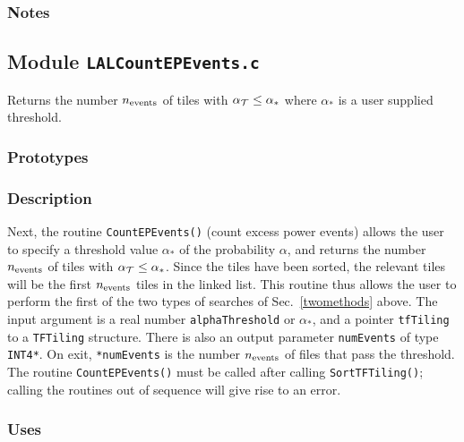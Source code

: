 \subsubsection*{Notes}

\vfill{\footnotesize}

\newpage
\subsection{Module \texttt{LALCountEPEvents.c}}
\label{ss:LALCountEPEvents.c}

Returns the number $n_{\rm events}$ of tiles with $\alpha_{\cal T} \le
\alpha_*$ where $\alpha_*$ is a user supplied threshold.

\subsubsection*{Prototypes}
\vspace{0.1in}


\subsubsection*{Description}

Next, the routine \verb+CountEPEvents()+ (count excess power events) allows
the user to specify a threshold value $\alpha_*$ of the probability $\alpha$,
and returns the number $n_{\rm events}$ of tiles with $\alpha_{\cal T} \le
\alpha_*$.  Since the tiles have been sorted, the relevant tiles will be the
first $n_{\rm events}$ tiles in the linked list.  This routine thus allows the
user to perform the first of the two types of searches of Sec.\
\ref{twomethods} above.  The input argument is a real number
\verb+alphaThreshold+ or $\alpha_*$, and a pointer \verb+tfTiling+ to a
\verb+TFTiling+ structure.  There is also an output parameter \verb+numEvents+
of type \verb+INT4*+.  On exit, \verb+*numEvents+ is the number $n_{\rm
events}$ of files that pass the threshold.  The routine \verb+CountEPEvents()+
must be called after calling \verb+SortTFTiling()+; calling the routines out
of sequence will give rise to an error.

\subsubsection*{Uses}

